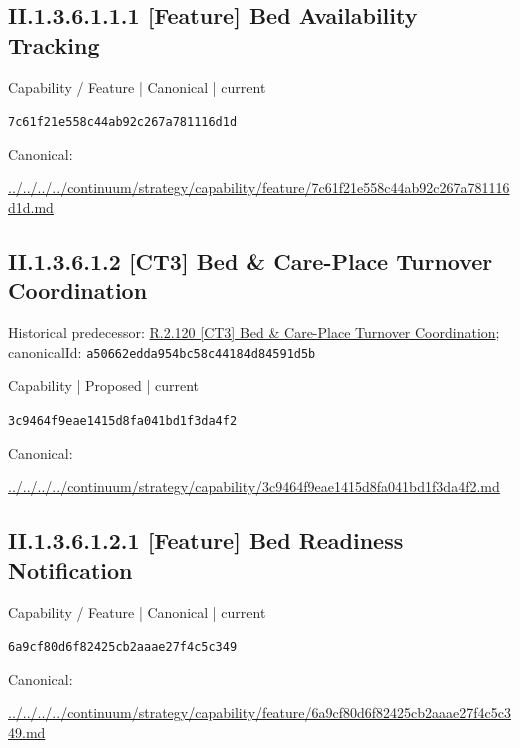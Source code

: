 \documentclass[10pt,a4paper]{article}
\begin{document}
\subsection*{II.1.3.6.1.1.1 [Feature] Bed Availability Tracking}
\label{element-7c61f21e558c44ab92c267a781116d1d}
{\small Capability / Feature | Canonical | current}\par
\texttt{7c61f21e558c44ab92c267a781116d1d}\par
Canonical: \par
{\footnotesize\url{../../../../continuum/strategy/capability/feature/7c61f21e558c44ab92c267a781116d1d.md}}\par
\subsection*{II.1.3.6.1.2 [CT3] Bed \& Care-Place Turnover Coordination}
Historical predecessor: \hyperref[element-a50662edda954bc58c44184d84591d5b]{R.2.120 [CT3] Bed \& Care-Place Turnover Coordination}; canonicalId: \texttt{a50662edda954bc58c44184d84591d5b}\par
\label{element-3c9464f9eae1415d8fa041bd1f3da4f2}
{\small Capability | Proposed | current}\par
\texttt{3c9464f9eae1415d8fa041bd1f3da4f2}\par
Canonical: \par
{\footnotesize\url{../../../../continuum/strategy/capability/3c9464f9eae1415d8fa041bd1f3da4f2.md}}\par
\subsection*{II.1.3.6.1.2.1 [Feature] Bed Readiness Notification}
\label{element-6a9cf80d6f82425cb2aaae27f4c5c349}
{\small Capability / Feature | Canonical | current}\par
\texttt{6a9cf80d6f82425cb2aaae27f4c5c349}\par
Canonical: \par
{\footnotesize\url{../../../../continuum/strategy/capability/feature/6a9cf80d6f82425cb2aaae27f4c5c349.md}}\par
\end{document}
